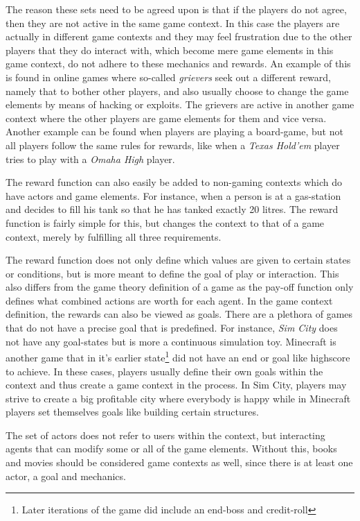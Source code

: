 \documentclass[11pt]{article}
\begin{document}
The reason these sets need to be agreed upon is that if the players do not agree, then they are not active in the same game context. In this case the players are actually in different game contexts and they may feel frustration due to the other players that they do interact with, which become mere game elements in this game context, do not adhere to these mechanics and rewards. An example of this is found in online games where so-called \emph{grievers} seek out a different reward, namely that to bother other players, and also usually choose to change the game elements by means of hacking or exploits. The grievers are active in another game context where the other players are game elements for them and vice versa. Another example can be found when players are playing a board-game, but not all players follow the same rules for rewards, like when a \emph{Texas Hold'em} player tries to play with a \emph{Omaha High} player.

The reward function can also easily be added to non-gaming contexts which do have actors and game elements. For instance, when a person is at a gas-station and decides to fill his tank so that he has tanked exactly 20 litres. The reward function is fairly simple for this, but changes the context to that of a game context, merely by fulfilling all three requirements. 

The reward function does not only define which values are given to certain states or conditions, but is more meant to define the goal of play or interaction. This also differs from the game theory definition of a game as the pay-off function only defines what combined actions are worth for each agent. In the game context definition, the rewards can also be viewed as goals. There are a plethora of games that do not have a precise goal that is predefined. For instance, \emph{Sim City} does not have any goal-states but is more a continuous simulation toy. Minecraft is another game that in it's earlier state\footnote{Later iterations of the game did include an end-boss and credit-roll} did not have an end or goal like highscore to achieve. In these cases, players usually define their own goals within the context and thus create a game context in the process. In Sim City, players may strive to create a big profitable city where everybody is happy while in Minecraft players set themselves goals like building 
certain structures.

The set of actors does not refer to users within the context, but interacting agents that can modify some or all of the game elements. Without this, books and movies should be considered game contexts as well, since there is at least one actor, a goal and mechanics. 
\end{document}

